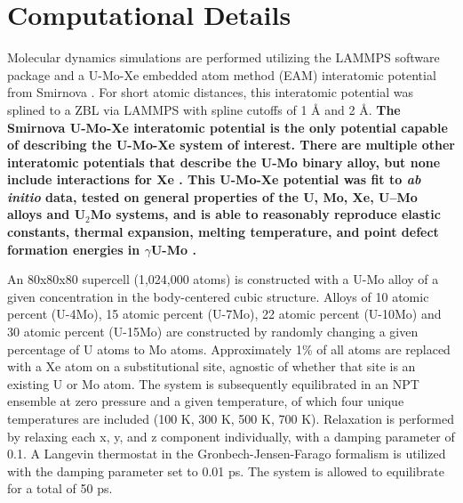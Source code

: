 \documentclass[review]{elsarticle}
\providecommand{\DIFaddtex}[1]{{\bf #1}} %
\providecommand{\DIFaddbegin}{\protect\color{blue}} %
\providecommand{\DIFaddend}{\protect\color{black}} %
\providecommand{\DIFadd}[1]{\texorpdfstring{\DIFaddtex{#1}}{#1}} %
\newcommand{\DIFaddincludegraphics}[2][]{{\color{blue}\fbox{\DIFOincludegraphics[#1]{#2}}}} %
\DeclareRobustCommand{\DIFaddbegin}{\DIFOaddbegin \let\includegraphics\DIFaddincludegraphics} %
\DeclareRobustCommand{\DIFaddend}{\DIFOaddend \let\includegraphics\DIFOincludegraphics} %
\begin{document}
\section{Computational Details}

Molecular dynamics simulations are performed utilizing the LAMMPS \cite{plimpton1995} software package and a U-Mo-Xe embedded atom method (EAM) interatomic potential from Smirnova \cite{smirnovaUMo}. For short atomic distances, this interatomic potential was splined to a ZBL \cite{zbl} via LAMMPS with spline cutoffs of 1 {\AA} and 2 {\AA}. \DIFaddbegin \DIFadd{The Smirnova U-Mo-Xe interatomic potential is the only potential capable of describing the U-Mo-Xe system of interest. There are multiple other interatomic potentials that describe the U-Mo binary alloy, but none include interactions for Xe \cite{smirnovaADP, starikov2018}. This U-Mo-Xe potential was fit to \textit{ab initio} data, tested on general properties of the U, Mo, Xe, U–Mo alloys and U$_2$Mo systems, and is able to reasonably reproduce elastic constants, thermal expansion, melting temperature, and point defect formation energies in $\gamma$U-Mo \cite{smirnovaUMo}.
}

\DIFaddend An 80x80x80 supercell (1,024,000 atoms) is constructed with a U-Mo alloy of a given concentration in the body-centered cubic structure. Alloys of 10 atomic percent (U-4Mo), 15 atomic percent (U-7Mo), 22 atomic percent (U-10Mo) and 30 atomic percent (U-15Mo) are constructed by randomly changing a given percentage of U atoms to Mo atoms. Approximately 1\% of all atoms are replaced with a Xe atom on a substitutional site, agnostic of whether that site is an existing U or Mo atom. The system is subsequently equilibrated in an NPT ensemble at zero pressure and a given temperature, of which four unique temperatures are included (100 K, 300 K, 500 K, 700 K). Relaxation is performed by relaxing each x, y, and z component individually, with a damping parameter of 0.1. A Langevin thermostat in the Gronbech-Jensen-Farago \cite{gjf2013, gjf2014} formalism is utilized with the damping parameter set to 0.01 ps. The system is allowed to equilibrate for a total of 50 ps.
\end{document}
